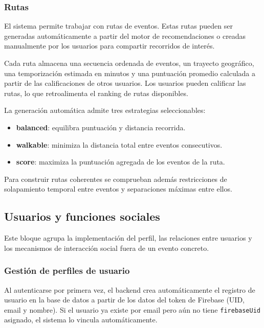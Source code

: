 \subsubsection{Rutas}

El sistema permite trabajar con rutas de eventos. Estas rutas pueden ser generadas automáticamente a partir del motor de recomendaciones o creadas manualmente por los usuarios para compartir recorridos de interés.

Cada ruta almacena una secuencia ordenada de eventos, un trayecto geográfico, una temporización estimada en minutos y una puntuación promedio calculada a partir de las calificaciones de otros usuarios. Los usuarios pueden calificar las rutas, lo que retroalimenta el ranking de rutas disponibles.

La generación automática admite tres estrategias seleccionables:

\begin{itemize}
    \item \textbf{balanced}: equilibra puntuación y distancia recorrida.
    \item \textbf{walkable}: minimiza la distancia total entre eventos consecutivos.
    \item \textbf{score}: maximiza la puntuación agregada de los eventos de la ruta.
\end{itemize}

Para construir rutas coherentes se comprueban además restricciones de solapamiento temporal entre eventos y separaciones máximas entre ellos.

\subsection{Usuarios y funciones sociales}

Este bloque agrupa la implementación del perfil, las relaciones entre usuarios y los mecanismos de interacción social fuera de un evento concreto.

\subsubsection{Gestión de perfiles de usuario}

Al autenticarse por primera vez, el backend crea automáticamente el registro de usuario en la base de datos a partir de los datos del token de Firebase (UID, email y nombre). Si el usuario ya existe por email pero aún no tiene \texttt{firebaseUid} asignado, el sistema lo vincula automáticamente.

